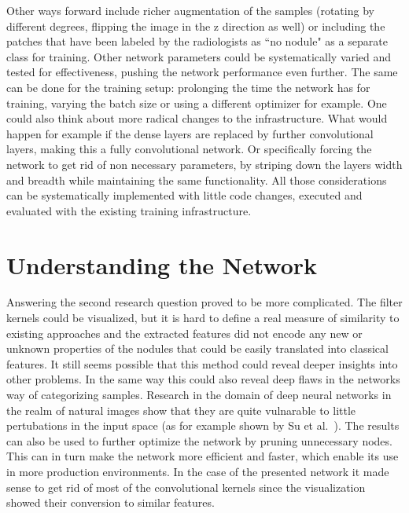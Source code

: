 \documentclass[main.tex]{subfiles}
\begin{document}
Other ways forward include richer augmentation of the samples (rotating by different degrees, flipping the image in the z direction as well) or including the patches that have been labeled by the radiologists as ``no nodule" as a separate class for training. Other network parameters could be systematically varied and tested for effectiveness, pushing the network performance even further. The same can be done for the training setup: prolonging the time the network has for training, varying the batch size or using a different optimizer for example. One could also think about more radical changes to the infrastructure. What would happen for example if the dense layers are replaced by further convolutional layers, making this a fully convolutional network. Or specifically forcing the network to get rid of non necessary parameters, by striping down the layers width and breadth while maintaining the same functionality. All those considerations can be systematically implemented with little code changes, executed and evaluated with the existing training infrastructure.

\section{Understanding the Network}
Answering the second research question proved to be more complicated. The filter kernels could be visualized, but it is hard to define a real measure of similarity to existing approaches and the extracted features did not encode any new or unknown properties of the nodules that could be easily translated into classical features. It still seems possible that this method could reveal deeper insights into other problems. In the same way this could also reveal deep flaws in the networks way of categorizing samples. Research in the domain of deep neural networks in the realm of natural images show that they are quite vulnarable to little pertubations in the input space (as for example shown by Su et al.~\cite{su2017one}). The results can also be used to further optimize the network by pruning unnecessary nodes. This can in turn make the network more efficient and faster, which enable its use in more production environments. In the case of the presented network it made sense to get rid of most of the convolutional kernels since the visualization showed their conversion to similar features.
\end{document}
